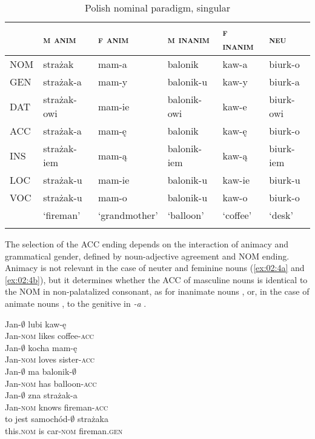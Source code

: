 \begin{table}
    \begin{tabular}{llllll}
\lsptoprule
         & \textsc{m anim} & \textsc{f anim} & \textsc{m inanim} & \textsc{f inanim} & \textsc{neu}\\
\midrule
        NOM & strażak & mam-a & balonik & kaw-a & biurk-o\\
        GEN & strażak-a & mam-y & balonik-u & kaw-y & biurk-a\\
        DAT & strażak-owi & mam-ie & balonik-owi & kaw-e & biurk-owi\\
        ACC & strażak-a & mam-ę & balonik & kaw-ę & biurk-o\\
        INS & strażak-iem & mam-ą & balonik-iem & kaw-ą & biurk-iem\\
        LOC & strażak-u & mam-ie & balonik-u & kaw-ie & biurk-u\\
        VOC & strażak-u & mam-o & balonik-u & kaw-o & biurk-o\\
        & ‘fireman’ & ‘grandmother’ & ‘balloon’ & ‘coffee’ & ‘desk’\\
\lspbottomrule
    \end{tabular}
    \caption{Polish nominal paradigm, singular}
    \label{tab:02:3a}
\end{table}

The selection of the ACC ending depends on the interaction of animacy and grammatical gender, defined by noun-adjective agreement and NOM ending. Animacy is not relevant in the case of neuter and feminine nouns (\ref{ex:02:4a} and \ref{ex:02:4b}), but it determines whether the ACC of masculine nouns is identical to the NOM in non-palatalized consonant, as for inanimate nouns , or, in the case of animate nouns , to the genitive in \textit{-a} .

\ea%
    \label{ex:02:4}
    \ea\label{ex:02:4a}
    \gll    Jan-${\emptyset}$ lubi kaw-ę\\
            Jan-\textsc{nom}  likes    coffee-\textsc{acc}\\
    \ex\label{ex:02:4b}
    \gll    Jan-${\emptyset}$ kocha mam-ę\\
            Jan-\textsc{nom} loves sister-\textsc{acc}\\
    \ex\label{ex:02:4c}
    \gll    Jan-${\emptyset}$ ma balonik-${\emptyset}$\\
            Jan-\textsc{nom} has balloon-\textsc{acc}\\
    \ex\label{ex:02:4d}
    \gll    Jan-${\emptyset}$ zna strażak-a\\
            Jan-\textsc{nom} knows fireman-\textsc{acc}\\
    \ex\label{ex:02:4e}
    \gll    to jest samochód-${\emptyset}$ strażaka\\
            this.\textsc{nom}  is  car-\textsc{nom}  fireman.\textsc{gen}\\
    \z
\z

